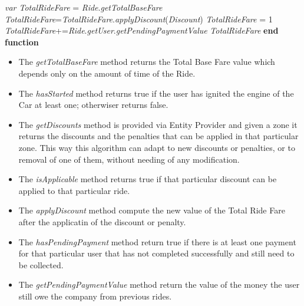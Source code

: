 \begin{algorithm}
\caption{}\label{euclid}
\begin{algorithmic}[1]
\State \textit{var TotalRideFare} = \textit{Ride}.\textit{getTotalBaseFare}
\State \textit{TotalRideFare}=\textit{TotalRideFare}.\textit{applyDiscount}(\textit{Discount})
\EndIf
\EndFor
\Else
\State \textit{TotalRideFare} = 1
\EndIf
{}
\State \textit{TotalRideFare}+=\textit{Ride}.\textit{getUser}.\textit{getPendingPaymentValue}
\EndIf
\State \Return \textit{TotalRideFare}
\EndFunction
\State \textbf{end function}
\end{algorithmic}
\end{algorithm}

\begin{itemize}
    \item The \textit{getTotalBaseFare} method returns the Total Base Fare value which depends only on the amount of time of the Ride.
    \item The \textit{hasStarted} method returns true if the user has ignited the engine of the Car at least one; otherwiser returns false.
    \item The \textit{getDiscounts} method is provided via Entity Provider and given a zone it returns the discounts and the penalties that can be applied in that particular zone.\newline
    This way this algorithm can adapt to new discounts or penalties, or to removal of one of them, without needing of any modification.
    \item The \textit{isApplicable} method returns true if that particular discount can be applied to that particular ride.
    \item The \textit{applyDiscount} method compute the new value of the Total Ride Fare after the applicatin of the discount or penalty.
      \item The \textit{hasPendingPayment} method return true if there is at least one payment for that particular user that has not completed successfully and still need to be collected.
       \item The \textit{getPendingPaymentValue} method return the value of the money the user still owe the company from previous rides.
\end{itemize}